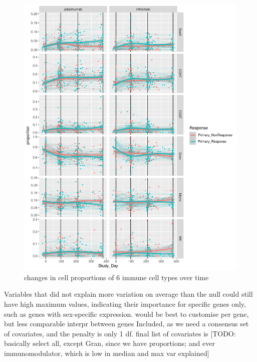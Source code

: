 \begin{outline}
\begin{figure}
    \centering
    \includegraphics[width=1.0\textwidth,page=1]{mainmatter/figures/chapter_04/dream.cell_type_proportion_vs_Study_Day.pdf}
    \caption{changes in cell proportions of 6 immune cell types over time}
    \label{fig:multipants_cell_type_proportion_vs_Study_Day}
\end{figure}

\1 Variables that did not explain more variation on average than the null could still have high maximum values, 
    indicating their importance for specific genes only, such as genes with sex-specific expression.
    \2 would be best to customise per gene, but less comparable interpr between genes
    \2 Included, as we need a consensus set of covariates, and the penalty is only 1 df.
    \2 final list of covariates is [TODO: basically select all, except Gran, since we have proportions; and ever immunomodulator, which is low in median and max var explained]


\end{outline}
